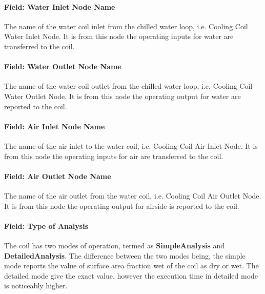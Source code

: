 \paragraph{Field: Water Inlet Node Name}\label{field-water-inlet-node-name-000}

The name of the water coil inlet from the chilled water loop, i.e. Cooling Coil Water Inlet Node. It is from this node the operating inputs for water are transferred to the coil.

\paragraph{Field: Water Outlet Node Name}\label{field-water-outlet-node-name-000}

The name of the water coil outlet from the chilled water loop, i.e. Cooling Coil Water Outlet Node. It is from this node the operating output for water are reported to the coil.

\paragraph{Field: Air Inlet Node Name}\label{field-air-inlet-node-name-003}

The name of the air inlet to the water coil, i.e. Cooling Coil Air Inlet Node. It is from this node the operating inputs for air are transferred to the coil.

\paragraph{Field: Air Outlet Node Name}\label{field-air-outlet-node-name-003}

The name of the air outlet from the water coil, i.e. Cooling Coil Air Outlet Node. It is from this node the operating output for airside is reported to the coil.

\paragraph{Field: Type of Analysis}\label{field-type-of-analysis}

The coil has two modes of operation, termed as \textbf{SimpleAnalysis} and \textbf{DetailedAnalysis}. The difference between the two modes being, the simple mode reports the value of surface area fraction wet of the coil as dry or wet. The detailed mode give the exact value, however the execution time in detailed mode is noticeably higher.

